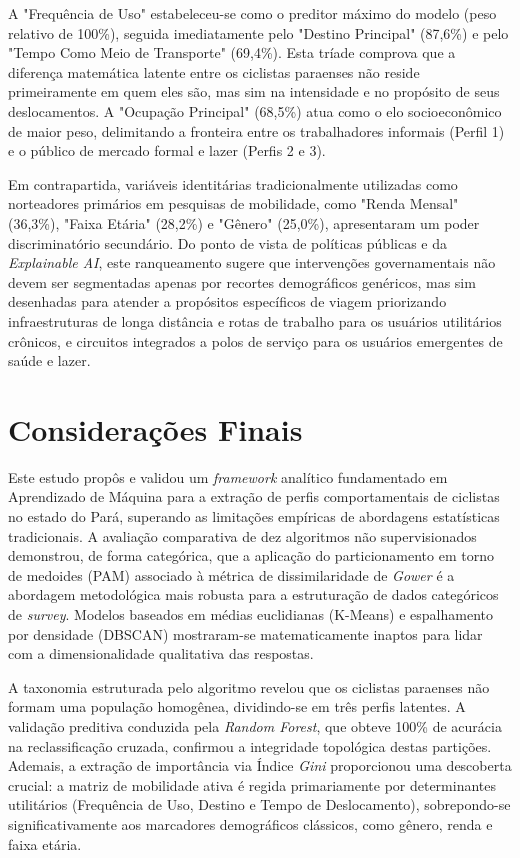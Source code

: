 \documentclass[12pt]{article}
\begin{document}
A "Frequência de Uso" estabeleceu-se como o preditor máximo do modelo (peso relativo de 100\%), seguida imediatamente pelo "Destino Principal" (87,6\%) e pelo "Tempo Como Meio de Transporte" (69,4\%). Esta tríade comprova que a diferença matemática latente entre os ciclistas paraenses não reside primeiramente em quem eles são, mas sim na intensidade e no propósito de seus deslocamentos. A "Ocupação Principal" (68,5\%) atua como o elo socioeconômico de maior peso, delimitando a fronteira entre os trabalhadores informais (Perfil 1) e o público de mercado formal e lazer (Perfis 2 e 3).

\newpage
Em contrapartida, variáveis identitárias tradicionalmente utilizadas como norteadores primários em pesquisas de mobilidade, como "Renda Mensal" (36,3\%), "Faixa Etária" (28,2\%) e "Gênero" (25,0\%), apresentaram um poder discriminatório secundário. Do ponto de vista de políticas públicas e da \textit{Explainable AI}, este ranqueamento sugere que intervenções governamentais não devem ser segmentadas apenas por recortes demográficos genéricos, mas sim desenhadas para atender a propósitos específicos de viagem priorizando infraestruturas de longa distância e rotas de trabalho para os usuários utilitários crônicos, e circuitos integrados a polos de serviço para os usuários emergentes de saúde e lazer.

\section{Considerações Finais}

Este estudo propôs e validou um \textit{framework} analítico fundamentado em Aprendizado de Máquina para a extração de perfis comportamentais de ciclistas no estado do Pará, superando as limitações empíricas de abordagens estatísticas tradicionais. A avaliação comparativa de dez algoritmos não supervisionados demonstrou, de forma categórica, que a aplicação do particionamento em torno de medoides (PAM) associado à métrica de dissimilaridade de \textit{Gower} é a abordagem metodológica mais robusta para a estruturação de dados categóricos de \textit{survey}. Modelos baseados em médias euclidianas (K-Means) e espalhamento por densidade (DBSCAN) mostraram-se matematicamente inaptos para lidar com a dimensionalidade qualitativa das respostas.

A taxonomia estruturada pelo algoritmo revelou que os ciclistas paraenses não formam uma população homogênea, dividindo-se em três perfis latentes. A validação preditiva conduzida pela \textit{Random Forest}, que obteve 100\% de acurácia na reclassificação cruzada, confirmou a integridade topológica destas partições. Ademais, a extração de importância via Índice \textit{Gini} proporcionou uma descoberta crucial: a matriz de mobilidade ativa é regida primariamente por determinantes utilitários (Frequência de Uso, Destino e Tempo de Deslocamento), sobrepondo-se significativamente aos marcadores demográficos clássicos, como gênero, renda e faixa etária.
\end{document}
